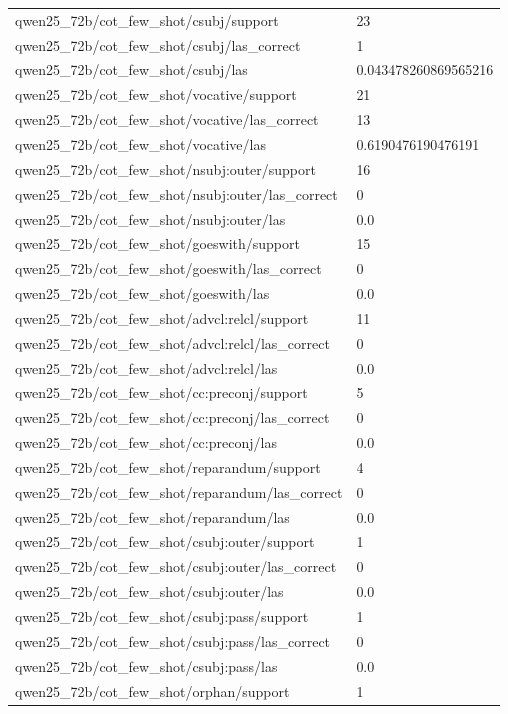 \begin{tabular}{ll}
qwen25\_72b/cot\_few\_shot/csubj/support & 23 \\
qwen25\_72b/cot\_few\_shot/csubj/las\_correct & 1 \\
qwen25\_72b/cot\_few\_shot/csubj/las & 0.043478260869565216 \\
qwen25\_72b/cot\_few\_shot/vocative/support & 21 \\
qwen25\_72b/cot\_few\_shot/vocative/las\_correct & 13 \\
qwen25\_72b/cot\_few\_shot/vocative/las & 0.6190476190476191 \\
qwen25\_72b/cot\_few\_shot/nsubj:outer/support & 16 \\
qwen25\_72b/cot\_few\_shot/nsubj:outer/las\_correct & 0 \\
qwen25\_72b/cot\_few\_shot/nsubj:outer/las & 0.0 \\
qwen25\_72b/cot\_few\_shot/goeswith/support & 15 \\
qwen25\_72b/cot\_few\_shot/goeswith/las\_correct & 0 \\
qwen25\_72b/cot\_few\_shot/goeswith/las & 0.0 \\
qwen25\_72b/cot\_few\_shot/advcl:relcl/support & 11 \\
qwen25\_72b/cot\_few\_shot/advcl:relcl/las\_correct & 0 \\
qwen25\_72b/cot\_few\_shot/advcl:relcl/las & 0.0 \\
qwen25\_72b/cot\_few\_shot/cc:preconj/support & 5 \\
qwen25\_72b/cot\_few\_shot/cc:preconj/las\_correct & 0 \\
qwen25\_72b/cot\_few\_shot/cc:preconj/las & 0.0 \\
qwen25\_72b/cot\_few\_shot/reparandum/support & 4 \\
qwen25\_72b/cot\_few\_shot/reparandum/las\_correct & 0 \\
qwen25\_72b/cot\_few\_shot/reparandum/las & 0.0 \\
qwen25\_72b/cot\_few\_shot/csubj:outer/support & 1 \\
qwen25\_72b/cot\_few\_shot/csubj:outer/las\_correct & 0 \\
qwen25\_72b/cot\_few\_shot/csubj:outer/las & 0.0 \\
qwen25\_72b/cot\_few\_shot/csubj:pass/support & 1 \\
qwen25\_72b/cot\_few\_shot/csubj:pass/las\_correct & 0 \\
qwen25\_72b/cot\_few\_shot/csubj:pass/las & 0.0 \\
qwen25\_72b/cot\_few\_shot/orphan/support & 1 \\

\end{tabular}
